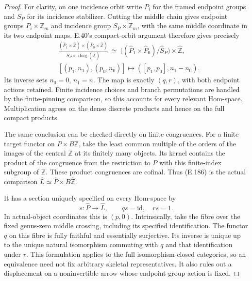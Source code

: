 \begin{proof}
For clarity, on one incidence orbit write $P_i$ for the
framed endpoint groups and $S_P$ for its incidence stabilizer.
Cutting the middle chain gives endpoint groups
$P_i\times\mathbb Z_m$ and incidence group
$S_P\times\mathbb Z_m$, with the same middle coordinate in
its two endpoint maps.  E.40's compact-orbit argument therefore
gives precisely
\[
 \begin{split}
 &\frac{(\widehat P_1\times\widehat{\mathbb Z})
                \times(\widehat P_0\times\widehat{\mathbb Z})}
             {\widehat S_P\times
                      \operatorname{diag}(\widehat{\mathbb Z})}
 \ \simeq\ 
 \bigl((\widehat P_1\times\widehat P_0)/\widehat S_P\bigr)
                       \times\widehat{\mathbb Z},\\
 &[(p_1,n_1),(p_0,n_0)]\longmapsto([p_1,p_0],n_1-n_0).
 \end{split}                                                 \tag{E.186}
\]
Its inverse sets $n_0=0$, $n_1=n$.  The map is exactly $(q,r)$,
with both endpoint actions retained.  Finite incidence choices
and branch permutations are handled by the finite-pinning
comparison, so this accounts for every relevant Hom-space.
Multiplication agrees on the dense discrete products and
hence on the full compact products.

The same conclusion can be checked directly on finite
congruences.  For a finite target functor on $P\times B\mathbb Z$,
take the least common multiple of the orders of the images of
the central $\mathbb Z$ at its finitely many objects.  Its
kernel contains the product of the congruence from the
restriction to $P$ with this finite-index subgroup of
$\mathbb Z$.  These product congruences are cofinal.
Thus (E.186) is the actual comparison
$\widehat L\simeq\widehat P\times B\widehat{\mathbb Z}$.

It has a section uniquely specified on every Hom-space by
\[
 s:\widehat P\longrightarrow\widehat L,
                    \qquad qs=\mathrm{id},\quad rs=1.        \tag{E.187}
\]
In actual-object coordinates this is $(p,0)$.  Intrinsically,
take the fibre over the fixed genus-zero middle crossing,
including its specified identification.  The functor $q$
on this fibre is fully faithful and essentially surjective.
Its inverse is unique up to the unique natural isomorphism
commuting with $q$ and that identification under $r$.
This formulation applies to the full isomorphism-closed
categories, so an equivalence need not fix arbitrary
skeletal representatives.  It also rules out a displacement
on a noninvertible arrow whose endpoint-group action is fixed.


\end{proof}

